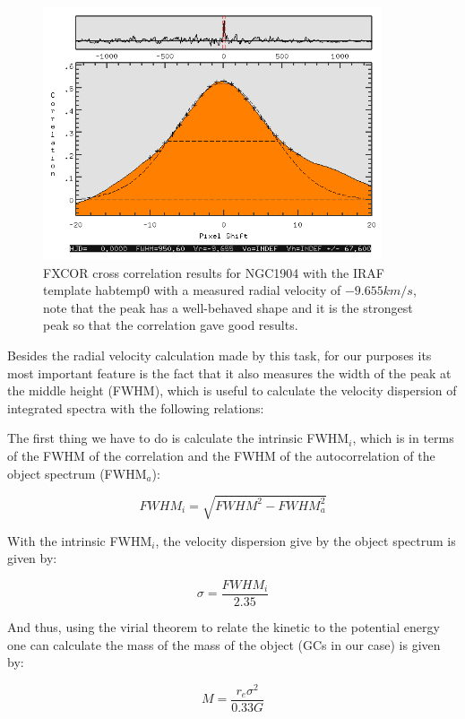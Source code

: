 \begin{figure}[H]
\centering
\includegraphics[width=10cm]{images/fxcor.png}
\caption[FXCOR results for NGC1904]{FXCOR cross correlation results for NGC1904 with the IRAF template habtemp0 with a measured radial velocity of $-9.655km/s$, note that the peak has a well-behaved shape and it is the strongest peak so that the correlation gave good results.}
\end{figure}

Besides the radial velocity calculation made by this task, for our purposes its most important feature is the fact that it also measures the width of the peak at the middle height (FWHM), which is useful to calculate the velocity dispersion of integrated spectra with the following relations:

The first thing we have to do is calculate the intrinsic FWHM$_{i}$, which is in terms of the FWHM of the correlation and the FWHM of the autocorrelation of the object spectrum (FWHM$_{a}$):

\begin{equation}
FWHM_{i}=\sqrt{{FWHM^{2}}-{FWHM_{a}^{2}}}
\end{equation}

With the intrinsic FWHM$_{i}$, the velocity dispersion give by the object spectrum is given by:

\begin{equation}
\sigma=\frac{FWHM_{i}}{2.35}
\end{equation}

And thus, using the virial theorem to relate the kinetic to the potential energy one can calculate the mass of the mass of the object (GCs in our case) is given by:

\begin{equation}
M=\frac{r_{e}\sigma^{2}}{0.33G}
\end{equation}

